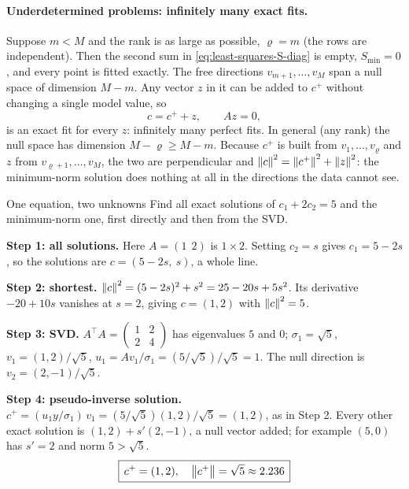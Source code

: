 \paragraph{Underdetermined problems: infinitely many exact fits.} Suppose $m<M$ and the rank is as large as possible, $\varrho = m$ (the rows are independent). Then the second sum in \cref{eq:least-squares-S-diag} is empty, $S_{\min}=0$, and every point is fitted exactly. The free directions $v_{m+1},\dots,v_M$ span a null space of dimension $M - m$. Any vector $z$ in it can be added to $c^+$ without changing a single model value, so
\begin{equation}
c = c^+ + z,\qquad Az = 0,
\label{eq:least-squares-general-sol}
\end{equation}
is an exact fit for every $z$: infinitely many perfect fits. In general (any rank) the null space has dimension $M - \varrho \ge M - m$. Because $c^+$ is built from $v_1,\dots,v_\varrho$ and $z$ from $v_{\varrho+1},\dots,v_M$, the two are perpendicular and $\left\lVert c\right\rVert^2 = \left\lVert c^+\right\rVert^2 + \left\lVert z\right\rVert^2$: the minimum-norm solution does nothing at all in the directions the data cannot see.

\begin{sample}{One equation, two unknowns}
Find all exact solutions of $c_1 + 2c_2 = 5$ and the minimum-norm one, first directly and then from the SVD.

\textbf{Step 1: all solutions.} Here $A = (1\ \ 2)$ is $1\times 2$. Setting $c_2 = s$ gives $c_1 = 5 - 2s$, so the solutions are $c = (5-2s,\ s)$, a whole line.

\textbf{Step 2: shortest.} $\left\lVert c\right\rVert^2 = (5-2s)^2 + s^2 = 25 - 20s + 5s^2$. Its derivative $-20 + 10s$ vanishes at $s = 2$, giving $c = (1,2)$ with $\left\lVert c\right\rVert^2 = 5$.

\textbf{Step 3: SVD.} $A^\top A = \begin{pmatrix}1&2\\2&4\end{pmatrix}$ has eigenvalues $5$ and $0$; $\sigma_1 = \sqrt5$, $v_1 = (1,2)/\sqrt5$, $u_1 = Av_1/\sigma_1 = (5/\sqrt5)/\sqrt5 = 1$. The null direction is $v_2 = (2,-1)/\sqrt5$.

\textbf{Step 4: pseudo-inverse solution.} $c^+ = (u_1 y/\sigma_1)\,v_1 = (5/\sqrt5)(1,2)/\sqrt5 = (1,2)$, as in Step 2. Every other exact solution is $(1,2) + s'(2,-1)$, a null vector added; for example $(5,0)$ has $s'=2$ and norm $5 > \sqrt5$.
\[
\boxed{\,c^+ = (1,2),\quad \left\lVert c^+\right\rVert=\sqrt5\approx2.236\,}
\]
\end{sample}

